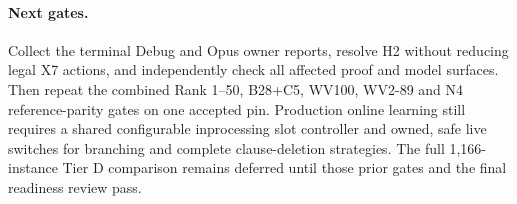 \documentclass[11pt]{article}
\begin{document}
\paragraph{Next gates.} Collect the terminal Debug and Opus owner reports,
resolve H2 without reducing legal X7 actions, and independently check all
affected proof and model surfaces. Then repeat the combined Rank 1--50,
B28+C5, WV100, WV2-89 and N4 reference-parity gates on one accepted pin.
Production online learning still requires a shared configurable inprocessing
slot controller and owned, safe live switches for branching and complete
clause-deletion strategies. The full 1,166-instance Tier D comparison remains
deferred until those prior gates and the final readiness review pass.
\end{document}
